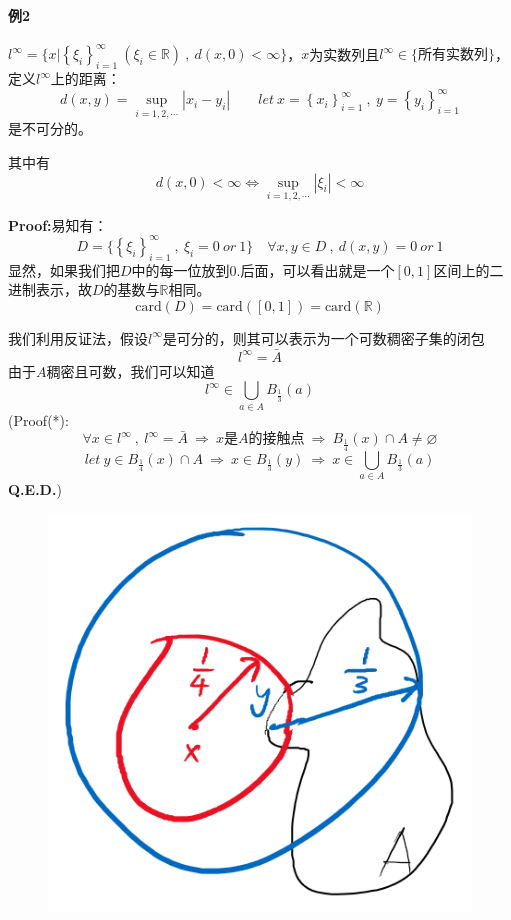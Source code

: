 \paragraph*{例2} \quad $l^{\infty}=\{x|\left\{\xi_i\right\}_{i=1}^{\infty} \ (\xi_i \in \mathbb{R}) \ , \ d(x,0)<\infty\}$，$x$为实数列且$l^{\infty} \in \{\text{所有实数列}\}$，定义$l^{\infty}$上的距离：
\[d(x,y)=\mathop {\text{sup}}\limits_{i=1,2,\cdots}|x_i-y_i| \qquad let \ x=\left\{x_i\right\}_{i=1}^{\infty} \ , \ y=\left\{y_i\right\}_{i=1}^{\infty}\]
是不可分的。

其中有
\[d(x,0)<\infty \Leftrightarrow \mathop {\text{sup}}\limits_{i=1,2,\cdots}|\xi_i|<\infty\]

\textbf{Proof:}易知有：
\[D=\{\left\{\xi_i\right\}_{i=1}^{\infty} \ , \ \xi_i=0 \ or \ 1\} \quad \forall x,y \in D \ , \ d(x,y)=0 \ or \ 1\]
显然，如果我们把$D$中的每一位放到$0.$后面，可以看出就是一个$[0,1]$区间上的二进制表示，故$D$的基数与$\mathbb{R}$相同。
\[\text{card}(D)=\text{card}([0,1])=\text{card}(\mathbb{R})\]

我们利用反证法，假设$l^{\infty}$是可分的，则其可以表示为一个可数稠密子集的闭包
\[l^{\infty}=\bar{A}\]
由于$A$稠密且可数，我们可以知道
\[l^{\infty} \in \bigcup_{a \in A}B_{\frac{1}{3}}(a) \tag{*}\]
(Proof(*): 
\[\forall x \in l^{\infty} \ , \ l^{\infty}=\bar{A} \ \Rightarrow \ x\text{是}A\text{的接触点} \ \Rightarrow \ B_{\frac{1}{4}}(x)\cap A \neq \varnothing\]
\[let \ y \in B_{\frac{1}{4}}(x)\cap A \ \Rightarrow \ x \in B_{\frac{1}{3}}(y) \ \Rightarrow \ x \in \bigcup_{a \in A}B_{\frac{1}{3}}(a)\]
\textbf{Q.E.D.})
\begin{figure}[htbp]
    \center
    \includegraphics[scale=0.5]{./fig/2.1.3_1.png}
\end{figure}

